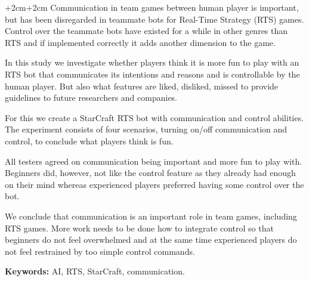 \abstract
\begin{changemargin}{+2cm}{+2cm}
\noindent
Communication in team games between human player is important, but has been disregarded in teammate
bots for Real-Time Strategy (RTS) games. Control over the teammate bots have existed for a while in
other genres than RTS and if implemented correctly it adds another dimension to the game.

In this study we investigate whether players think it is more fun to play with an RTS bot that
communicates its intentions and reasons and is controllable by the human player. But also what
features are liked, disliked, missed to provide guidelines to future researchers and companies.

For this we create a StarCraft RTS bot with communication and control abilities. The experiment
consists of four scenarios, turning on/off communication and control, to conclude what players think
is fun.

All testers agreed on communication being important and more fun to play with. Beginners did,
however, not like the control feature as they already had enough on their mind whereas experienced players
preferred having some control over the bot. 

We conclude that communication is an important role in team games, including RTS games. More work
needs to be done how to integrate control so that beginners do not feel overwhelmed and at the same
time experienced players do not feel restrained by too simple control commands.

\par\vspace {1cm}
\noindent
\textbf{Keywords:} AI, RTS, StarCraft, communication.
\end{changemargin}
\clearpage
